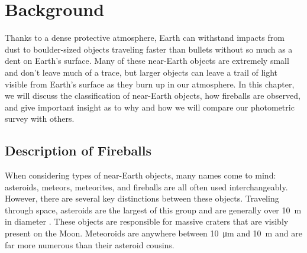 \chapter{Background}

Thanks to a dense protective atmosphere, Earth can withstand impacts from dust to boulder-sized objects traveling faster than bullets without so much as a dent on Earth's surface.
Many of these near-Earth objects are extremely small and don't leave much of a trace, but larger objects can leave a trail of light visible from Earth's surface as they burn up in our atmosphere.
In this chapter, we will discuss the classification of near-Earth objects, how fireballs are observed, and give important insight as to why and how we will compare our photometric survey with others.


\section{Description of Fireballs}

When considering types of near-Earth objects, many names come to mind: asteroids, meteors, meteorites, and fireballs are all often used interchangeably. 
However, there are several key distinctions between these objects.  
Traveling through space, asteroids are the largest of this group and are generally over \SI{10}{\meter} in diameter \cite{steel_meteoroid_1996}. 
These objects are responsible for massive craters that are visibly present on the Moon.
Meteoroids are anywhere between \SI{10}{\micro\meter} and \SI{10}{\meter} and are far more numerous than their asteroid cousins.  

